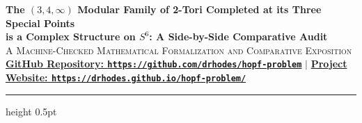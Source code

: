 \documentclass[10pt]{article}
\newcommand{\githubrepo}[1]{\href{https://github.com/drhodes/hopf-problem}{#1}}
\begin{document}
\begin{center}
    {\LARGE\bfseries The $(3,4,\infty)$ Modular Family of 2-Tori Completed at its Three Special Points}\\[0.3em]
    {\Large\bfseries is a Complex Structure on $S^6$: A Side-by-Side Comparative Audit}\\[0.8em]
    {\normalsize\scshape A Machine-Checked Mathematical Formalization and Comparative Exposition}\\[0.5em]
    {\small\githubrepo{\textbf{GitHub Repository: \texttt{https://github.com/drhodes/hopf-problem}}} \quad $\vert$ \quad \href{https://drhodes.github.io/hopf-problem/}{\textbf{Project Website: \texttt{https://drhodes.github.io/hopf-problem/}}}}
\end{center}

\vspace{0.5em}
\hrule height 0.5pt
\vspace{0.8em}
\end{document}
